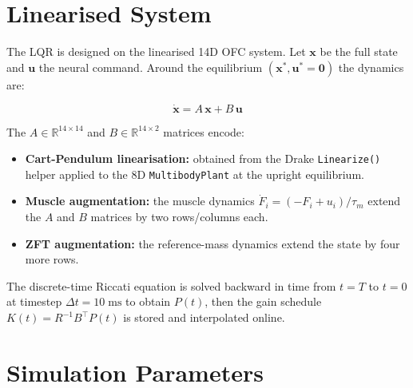 \documentclass[11pt, a4paper]{article}
\begin{document}
\section{Linearised System}

The LQR is designed on the linearised 14D OFC system.
Let $\bm{x}$ be the full state and $\bm{u}$ the neural command.
Around the equilibrium $(\bm{x}^*, \bm{u}^* = \bm{0})$ the dynamics are:

\[
\dot{\bm{x}} = A\,\bm{x} + B\,\bm{u}
\]

The $A \in \mathbb{R}^{14 \times 14}$ and $B \in \mathbb{R}^{14 \times 2}$
matrices encode:
\begin{itemize}
  \item \textbf{Cart-Pendulum linearisation:} obtained from the Drake
        \texttt{Linearize()} helper applied to the 8D \texttt{MultibodyPlant}
        at the upright equilibrium.
  \item \textbf{Muscle augmentation:} the muscle dynamics
        $\dot{F}_i = (-F_i + u_i)/\tau_m$ extend the $A$ and $B$ matrices by
        two rows/columns each.
  \item \textbf{ZFT augmentation:} the reference-mass dynamics extend the
        state by four more rows.
\end{itemize}

The discrete-time Riccati equation is solved backward in time from $t = T$ to
$t = 0$ at timestep $\Delta t = 10\;\mathrm{ms}$ to obtain $P(t)$, then the
gain schedule $K(t) = R^{-1}B^{\top}P(t)$ is stored and interpolated online.

\section{Simulation Parameters}
\end{document}
